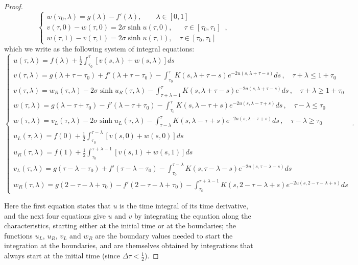 \documentclass[10pt]{amsart}
\newcommand{\rig}{R}
\newcommand{\lef}{L}
\begin{document}
\begin{proof}
\begin{equation}
\begin{cases}
w(\tau_0,\lambda)=g(\lambda) - f'(\lambda), \quad \quad \lambda \in [0,1] \\
v(\tau,0) - w(\tau,0) = 2\sigma \sinh u(\tau,0), \quad \,\,\,\, \tau\in [\tau_0, \tau_1] \\
w(\tau,1) - v(\tau,1) = 2\sigma \sinh u(\tau,1), \quad \tau\in [\tau_0, \tau_1]
\end{cases} \, ,
\end{equation}which we write as the following system of integral equations:
\begin{equation} \label{IBVP4}
\begin{cases}
u(\tau,\lambda) = f(\lambda) + \frac12 \int_{\tau_0}^\tau \left[ v(s,\lambda) + w(s,\lambda) \right] ds \\
v(\tau,\lambda)=g(\lambda + \tau - \tau_0) + f'(\lambda + \tau - \tau_0) - \int_{\tau_0}^\tau K(s,\lambda+\tau-s) e^{- 2u(s,\lambda+\tau-s)} ds \, , \quad \tau + \lambda \leq 1 + \tau_0 \\
v(\tau,\lambda)= w_\rig(\tau, \lambda) - 2 \sigma \sinh u_\rig(\tau,\lambda) - \int_{\tau + \lambda - 1}^\tau K(s,\lambda+\tau-s) e^{- 2u(s,\lambda+\tau-s)} ds \, , \quad \tau + \lambda\geq 1 + \tau_0 \\
w(\tau,\lambda)=g(\lambda - \tau + \tau_0) - f'(\lambda - \tau + \tau_0) - \int_{\tau_0}^\tau K(s,\lambda-\tau+s) e^{- 2u(s,\lambda-\tau+s)} ds \, , \quad \tau - \lambda \leq \tau_0 \\
w(\tau,\lambda)=v_\lef(\tau,\lambda) - 2 \sigma \sinh u_\lef(\tau,\lambda) - \int_{\tau - \lambda}^\tau K(s,\lambda-\tau+s) e^{- 2u(s,\lambda-\tau+s)} ds \, , \quad \tau - \lambda \geq \tau_0 \\
u_\lef(\tau,\lambda) = f(0) + \frac12 \int_{\tau_0}^{\tau-\lambda} \left[ v(s,0) + w(s,0) \right] ds \\
u_\rig(\tau,\lambda) = f(1) + \frac12 \int_{\tau_0}^{\tau+\lambda-1} \left[ v(s,1) + w(s,1) \right] ds \\
v_\lef(\tau,\lambda)=g(\tau - \lambda - \tau_0) + f'(\tau - \lambda - \tau_0) - \int_{\tau_0}^{\tau-\lambda} K(s,\tau-\lambda-s) e^{- 2u(s,\tau-\lambda-s)} ds \\
w_\rig(\tau,\lambda)=g(2 - \tau - \lambda + \tau_0) - f'(2 - \tau - \lambda + \tau_0) - \int_{\tau_0}^{\tau+\lambda-1} K(s,2 - \tau - \lambda+s) e^{- 2u(s,2 - \tau - \lambda+s)} ds
\end{cases} \, .
\end{equation}

Here the first equation states that $u$ is the time integral of its time derivative, and the next four equations give $u$ and $v$ by integrating the equation along the characteristics, starting either at the initial time or at the boundaries; the functions $u_\lef$, $u_\rig$, $v_\lef$ and $w_\rig$ are the boundary values needed to start the integration at the boundaries, and are themselves obtained by integrations that always start at the initial time (since $\Delta \tau < \frac12$).


\end{proof}
\end{document}
